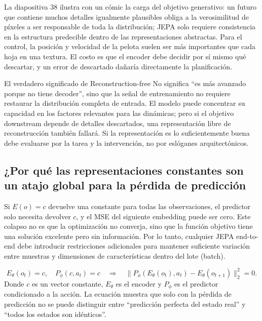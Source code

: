 La diapositiva 38 ilustra con un cómic la carga del objetivo generativo: un futuro que contiene muchos detalles igualmente plausibles obliga a la verosimilitud de píxeles a ser responsable de toda la distribución; JEPA solo requiere consistencia en la estructura predecible dentro de las representaciones abstractas. Para el control, la posición y velocidad de la pelota suelen ser más importantes que cada hoja en una textura. El costo es que el encoder debe decidir por sí mismo qué descartar, y un error de descartado dañaría directamente la planificación.


\begin{importantbox}{El verdadero significado de Reconstruction-free}
No significa ``es más avanzado porque no tiene decoder'', sino que la señal de entrenamiento no requiere restaurar la distribución completa de entrada. El modelo puede concentrar su capacidad en los factores relevantes para las dinámicas; pero si el objetivo downstream depende de detalles descartados, una representación libre de reconstrucción también fallará. Si la representación es lo suficientemente buena debe evaluarse por la tarea y la intervención, no por eslóganes arquitectónicos.
\end{importantbox}

\subsection{¿Por qué las representaciones constantes son un atajo global para la pérdida de predicción}

Si $E(o)=c$ devuelve una constante para todas las observaciones, el predictor solo necesita devolver $c$, y el MSE del siguiente embedding puede ser cero. Este colapso no es que la optimización no converja, sino que la función objetivo tiene una solución excelente pero sin información. Por lo tanto, cualquier JEPA end-to-end debe introducir restricciones adicionales para mantener suficiente variación entre muestras y dimensiones de características dentro del lote (batch).


\[
E_\theta(o_t)=c,\quad
P_\phi(c,a_t)=c
\quad\Longrightarrow\quad
\|P_\phi(E_\theta(o_t),a_t)-E_\theta(o_{t+1})\|_2^2=0.
\]
Donde $c$ es un vector constante, $E_\theta$ es el encoder y $P_\phi$ es el predictor condicionado a la acción. La ecuación muestra que solo con la pérdida de predicción no se puede distinguir entre ``predicción perfecta del estado real'' y ``todos los estados son idénticos''.

